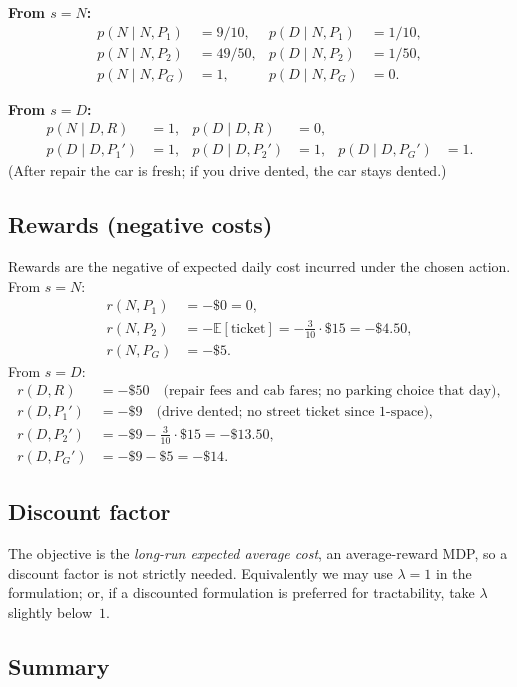 \documentclass[12pt]{article}
\newcommand{\EE}{\mathbb{E}}
\begin{document}
\textbf{From $s = N$:}
\begin{align*}
  p(N \mid N, P_1) &= 9/10, & p(D \mid N, P_1) &= 1/10, \\
  p(N \mid N, P_2) &= 49/50, & p(D \mid N, P_2) &= 1/50, \\
  p(N \mid N, P_G) &= 1, & p(D \mid N, P_G) &= 0.
\end{align*}

\textbf{From $s = D$:}
\begin{align*}
  p(N \mid D, R) &= 1, & p(D \mid D, R) &= 0, \\
  p(D \mid D, P_1') &= 1, & p(D \mid D, P_2') &= 1, & p(D \mid D, P_G') &= 1.
\end{align*}
(After repair the car is fresh; if you drive dented, the car stays dented.)

\subsection*{Rewards (negative costs)}

Rewards are the negative of expected daily cost incurred under the chosen action. From $s = N$:
\begin{align*}
  r(N, P_1) &= -\$0 = 0, \\
  r(N, P_2) &= -\EE[\text{ticket}] = -\tfrac{3}{10}\cdot\$15 = -\$4.50, \\
  r(N, P_G) &= -\$5.
\end{align*}
From $s = D$:
\begin{align*}
  r(D, R) &= -\$50 \quad \text{(repair fees and cab fares; no parking choice that day)}, \\
  r(D, P_1') &= -\$9 \quad \text{(drive dented; no street ticket since 1-space)}, \\
  r(D, P_2') &= -\$9 - \tfrac{3}{10}\cdot\$15 = -\$13.50, \\
  r(D, P_G') &= -\$9 - \$5 = -\$14.
\end{align*}

\subsection*{Discount factor}

The objective is the \emph{long-run expected average cost}, an average-reward MDP, so a discount factor is not strictly needed. Equivalently we may use $\lambda = 1$ in the formulation; or, if a discounted formulation is preferred for tractability, take $\lambda$ slightly below~$1$.

\subsection*{Summary}
\end{document}
